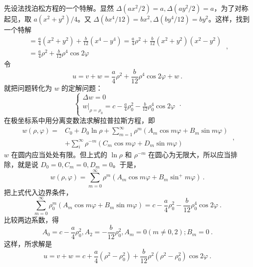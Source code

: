 \begin{example}{}
先设法找泊松方程的一个特解。显然 $\Delta (ax^2/2)=a, \Delta (ay^2/2)=a$，为了对称起见，取 $a(x^2+y^2)/4$。又 $\Delta (bx^4/12)=bx^2,\Delta (by^4/12)=by^2$。这样，找到一个特解
\begin{equation}
    \begin{array}{l}=\frac{a}{4}\left(x^{2}+y^{2}\right)+\frac{b}{12}\left(x^{4}-y^{4}\right)=\frac{a}{4} \rho^{2}+\frac{b}{12}\left(x^{2}+y^{2}\right)\left(x^{2}-y^{2}\right) \\ =\frac{a}{4} \rho^{2}+\frac{b}{12} \rho^{4} \cos 2 \varphi\end{array}~,
\end{equation}
令
\begin{equation}
    u=v+w=\frac{a}{4} \rho^{2}+\frac{b}{12} \rho^{4} \cos 2 \varphi+w~.
\end{equation}
就把问题转化为 $w$ 的定解问题：
\begin{equation}
    \left\{\begin{array}{l}\Delta w=0 \\ \left.w\right|_{\rho=\rho_{0}}=c-\frac{a}{4} \rho_{0}^{2}-\frac{b}{12} \rho_{0}^{4} \cos 2 \varphi\end{array}~.\right.
\end{equation}
在极坐标系中用分离变数法求解拉普拉斯方程，即
\begin{equation}
    \begin{aligned} w(\rho, \varphi)=& C_{0}+D_{0} \ln \rho+\sum_{m=1}^{\infty} \rho^{m}\left(A_{m} \cos m \varphi+B_{m} \sin m \varphi\right) \\ &+\sum_{i}^{\infty} \rho^{-m}\left(C_{m} \cos m \varphi+D_{m} \sin m \varphi\right) \end{aligned}~,
\end{equation}
$w $ 在圆内应当处处有限。但上式的 $\ln \rho $ 和 $\rho^{-m}$ 在圆心为无限大，所以应当排除，就是说 $D_0=0,C_m=0,D_m=0$。于是，
\begin{equation}
    w(\rho, \varphi)=\sum_{m=0}^{\infty} \rho^{m}\left(A_{m} \cos m \varphi+B_{m} \sin ^{+} m \varphi\right)~.
\end{equation}
把上式代入边界条件，
\begin{equation}
    \sum_{m=0}^{\infty} \rho_{0}^{m}\left(A_{m} \cos m \varphi+B_{m} \sin m \varphi\right)=c-\frac{a}{4} \rho_{0}^{2}-\frac{b}{12} \rho_{0}^{4} \cos 2 \varphi~.
\end{equation}
比较两边系数，得
\begin{equation}
    A_{0}=c-\frac{a}{4} \rho_{0}^{2}, A_{2}=-\frac{b}{12} \rho_{0}^{2}, A_{m}=0(m \neq 0,2) ; B_{m}=0~.
\end{equation}
这样，所求解是
\begin{equation}
    u=v+w=c+\frac{a}{4}\left(\rho^{2}-\rho_{0}^{2}\right)+\frac{b}{12} \rho^{2}\left(\rho^{2}-\rho_{0}^{2}\right) \cos 2 \varphi~.
\end{equation}
\end{example}

